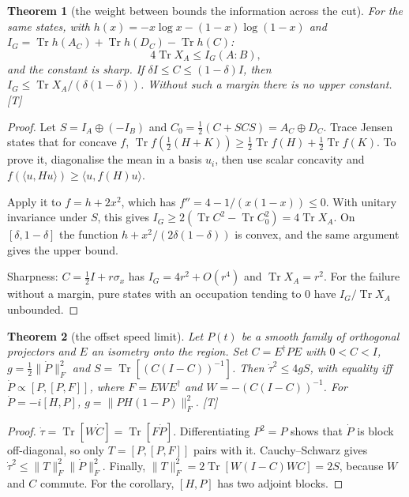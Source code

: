 \documentclass[11pt]{article}
\newtheorem{theorem}{Theorem}[section]
\theoremstyle{definition}
\newcommand{\grade}[1]{\textsf{\small[#1]}}
\newcommand{\Tr}{\operatorname{Tr}}
\begin{document}
\begin{theorem}[the weight between bounds the information across the cut]\label{thm:info}
For the same states, with $h(x)=-x\log x-(1-x)\log(1-x)$ and $I_G=\Tr h(A_C)+\Tr h(D_C)-\Tr h(C)$:
\[
4\Tr X_A\le I_G(A:B),
\]
and the constant is sharp. If $\delta I\le C\le(1-\delta)I$, then $I_G\le\Tr X_A/(\delta(1-\delta))$. Without such a margin there is no upper constant. \grade{T}
\end{theorem}
\begin{proof}
Let $S=I_A\oplus(-I_B)$ and $C_0=\tfrac12(C+SCS)=A_C\oplus D_C$. Trace Jensen states that for concave $f$, $\Tr f(\tfrac12(H+K))\ge\tfrac12\Tr f(H)+\tfrac12\Tr f(K)$. To prove it, diagonalise the mean in a basis $u_i$, then use scalar concavity and $f(\langle u,Hu\rangle)\ge\langle u,f(H)u\rangle$.

Apply it to $f=h+2x^2$, which has $f''=4-1/(x(1-x))\le0$. With unitary invariance under $S$, this gives $I_G\ge2(\Tr C^2-\Tr C_0^2)=4\Tr X_A$. On $[\delta,1-\delta]$ the function $h+x^2/(2\delta(1-\delta))$ is convex, and the same argument gives the upper bound.

Sharpness: $C=\tfrac12I+r\sigma_x$ has $I_G=4r^2+O(r^4)$ and $\Tr X_A=r^2$. For the failure without a margin, pure states with an occupation tending to $0$ have $I_G/\Tr X_A$ unbounded.
\end{proof}

\begin{theorem}[the offset speed limit]\label{thm:speed}
Let $P(t)$ be a smooth family of orthogonal projectors and $E$ an isometry onto the region. Set $C=E^\dagger PE$ with $0<C<I$, $g=\tfrac12\|\dot P\|_F^2$ and $S=\Tr[(C(I-C))^{-1}]$. Then $\dot\tau^2\le4gS$, with equality iff $\dot P\propto[P,[P,F]]$, where $F=EWE^\dagger$ and $W=-(C(I-C))^{-1}$. For $\dot P=-i[H,P]$, $g=\|PH(1-P)\|_F^2$. \grade{T}
\end{theorem}
\begin{proof}
$\dot\tau=\Tr[W\dot C]=\Tr[F\dot P]$. Differentiating $P^2=P$ shows that $\dot P$ is block off-diagonal, so only $T=[P,[P,F]]$ pairs with it. Cauchy--Schwarz gives $\dot\tau^2\le\|T\|_F^2\|\dot P\|_F^2$. Finally, $\|T\|_F^2=2\Tr[W(I-C)WC]=2S$, because $W$ and $C$ commute. For the corollary, $[H,P]$ has two adjoint blocks.
\end{proof}
\end{document}
